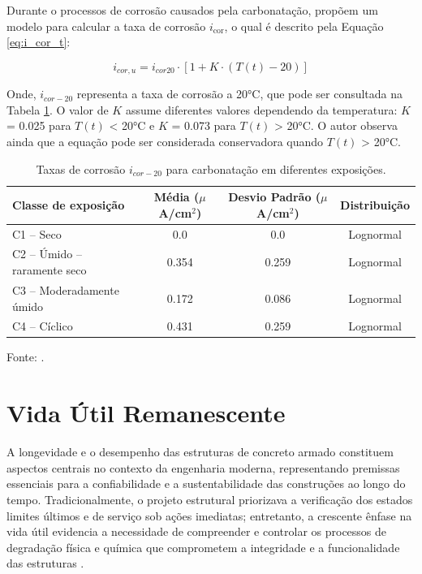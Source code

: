 Durante o processos de corrosão causados pela carbonatação, \textcite{peng_climate_2016} propõem um modelo para calcular a taxa de corrosão $i_{\text{cor}}$, o qual é descrito pela Equação \eqref{eq:i_cor_t}:

\begin{equation}\label{eq:i_cor_t}
i_{cor,u} = i_{cor 20} \cdot \left[ 1 + K \cdot (T(t) - 20) \right]
\end{equation}

Onde, $i_{cor-20}$ representa a taxa de corrosão a 20°C, que pode ser consultada na Tabela \ref{tab:taxa_icor}. O valor de $K$ assume diferentes valores dependendo da temperatura: $K$ = 0.025 para $T(t)$ < 20°C e $K$ = 0.073 para $T(t)$ > 20°C. O autor observa ainda que a equação pode ser considerada conservadora quando $T(t)$ > 20°C.

\begin{table}[H]
\centering
\caption{Taxas de corrosão $i_{cor-20}$ para carbonatação em diferentes exposições.}
\label{tab:taxa_icor}
\renewcommand{\arraystretch}{1.2} %
\begin{tabular}{lccc}
\toprule
\textbf{Classe de exposição} & \textbf{Média ($\mu$A/cm$^2$)} & \textbf{Desvio Padrão ($\mu$A/cm$^2$)} & \textbf{Distribuição} \\
\midrule
C1 -- Seco                        & 0.0   & 0.0   & Lognormal \\
C2 -- Úmido -- raramente seco     & 0.354 & 0.259 & Lognormal \\
C3 -- Moderadamente úmido        & 0.172 & 0.086 & Lognormal \\
C4 -- Cíclico                     & 0.431 & 0.259 & Lognormal \\
\bottomrule
\end{tabular}

\vspace{0.3em}
\raggedright \footnotesize Fonte: \cite{peng_climate_2016}.
\centering
\end{table}


\section{Vida Útil Remanescente} \label{TVU} 

A longevidade e o desempenho das estruturas de concreto armado constituem aspectos centrais no contexto da engenharia moderna, representando premissas essenciais para a confiabilidade e a sustentabilidade das construções ao longo do tempo. Tradicionalmente, o projeto estrutural priorizava a verificação dos estados limites últimos e de serviço sob ações imediatas; entretanto, a crescente ênfase na vida útil evidencia a necessidade de compreender e controlar os processos de degradação física e química que comprometem a integridade e a funcionalidade das estruturas \cite{helene_p_r_l_concreto_1993, neville_properties_2011}.

